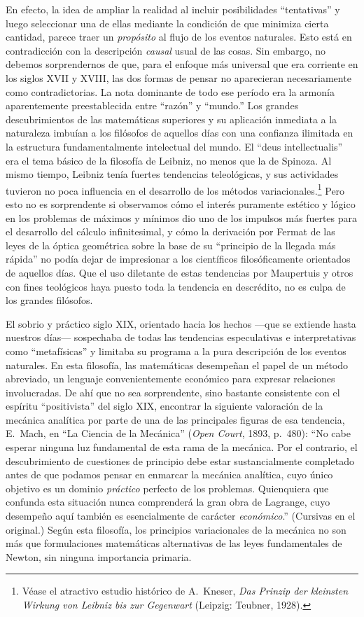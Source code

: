 En efecto, la idea de ampliar la realidad al incluir posibilidades ``tentativas'' y luego seleccionar una de ellas mediante la condición de que minimiza cierta cantidad, parece traer un \textit{propósito} al flujo de los eventos naturales. Esto está en contradicción con la descripción \textit{causal} usual de las cosas. Sin embargo, no debemos sorprendernos de que, para el enfoque más universal que era corriente en los siglos XVII y XVIII, las dos formas de pensar no aparecieran necesariamente como contradictorias. La nota dominante de todo ese período era la armonía aparentemente preestablecida entre ``razón'' y ``mundo.'' Los grandes descubrimientos de las matemáticas superiores y su aplicación inmediata a la naturaleza imbuían a los filósofos de aquellos días con una confianza ilimitada en la estructura fundamentalmente intelectual del mundo. El ``deus intellectualis'' era el tema básico de la filosofía de Leibniz, no menos que la de Spinoza. Al mismo tiempo, Leibniz tenía fuertes tendencias teleológicas, y sus actividades tuvieron no poca influencia en el desarrollo de los métodos variacionales.\footnote{Véase el atractivo estudio histórico de A.\ Kneser, \textit{Das Prinzip der kleinsten Wirkung von Leibniz bis zur Gegenwart} (Leipzig: Teubner, 1928).} Pero esto no es sorprendente si observamos cómo el interés puramente estético y lógico en los problemas de máximos y mínimos dio uno de los impulsos más fuertes para el desarrollo del cálculo infinitesimal, y cómo la derivación por Fermat de las leyes de la óptica geométrica sobre la base de su ``principio de la llegada más rápida'' no podía dejar de impresionar a los científicos filosóficamente orientados de aquellos días. Que el uso diletante de estas tendencias por Maupertuis y otros con fines teológicos haya puesto toda la tendencia en descrédito, no es culpa de los grandes filósofos.

El sobrio y práctico siglo XIX, orientado hacia los hechos ---que se extiende hasta nuestros días--- sospechaba de todas las tendencias especulativas e interpretativas como ``metafísicas'' y limitaba su programa a la pura descripción de los eventos naturales. En esta filosofía, las matemáticas desempeñan el papel de un método abreviado, un lenguaje convenientemente económico para expresar relaciones involucradas. De ahí que no sea sorprendente, sino bastante consistente con el espíritu ``positivista'' del siglo XIX, encontrar la siguiente valoración de la mecánica analítica por parte de una de las principales figuras de esa tendencia, E.\ Mach, en ``La Ciencia de la Mecánica'' (\textit{Open Court}, 1893, p.\ 480): ``No cabe esperar ninguna luz fundamental de esta rama de la mecánica. Por el contrario, el descubrimiento de cuestiones de principio debe estar sustancialmente completado antes de que podamos pensar en enmarcar la mecánica analítica, cuyo único objetivo es un dominio \textit{práctico} perfecto de los problemas. Quienquiera que confunda esta situación nunca comprenderá la gran obra de Lagrange, cuyo desempeño aquí también es esencialmente de carácter \textit{económico}.'' (Cursivas en el original.) Según esta filosofía, los principios variacionales de la mecánica no son más que formulaciones matemáticas alternativas de las leyes fundamentales de Newton, sin ninguna importancia primaria.

